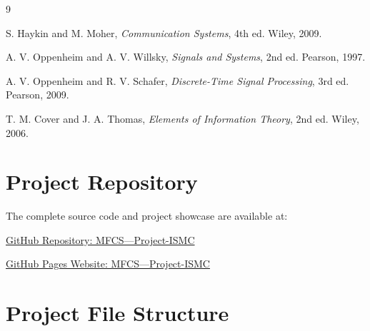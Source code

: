 \documentclass[12pt,a4paper]{report}
\begin{document}


\clearpage

\clearpage

\clearpage

\clearpage

\clearpage

\clearpage

\tableofcontents
\clearpage
\listoffigures
\clearpage
\listoftables
\clearpage













\appendix



\begin{thebibliography}{9}

S. Haykin and M. Moher, \textit{Communication Systems}, 4th ed. Wiley, 2009.

A. V. Oppenheim and A. V. Willsky, \textit{Signals and Systems}, 2nd ed. Pearson, 1997.

A. V. Oppenheim and R. V. Schafer, \textit{Discrete-Time Signal Processing}, 3rd ed. Pearson, 2009.

T. M. Cover and J. A. Thomas, \textit{Elements of Information Theory}, 2nd ed. Wiley, 2006.

\end{thebibliography}

\clearpage
\chapter*{Project Repository}
{}

The complete source code and project showcase are available at:

\noindent\href{https://github.com/TAditya007/MFCS---Project-ISMC}{GitHub Repository: MFCS---Project-ISMC}

\noindent\href{http://taditya007.github.io/MFCS---Project-ISMC/}{GitHub Pages Website: MFCS---Project-ISMC}

\clearpage
\chapter*{Project File Structure}
\end{document}
